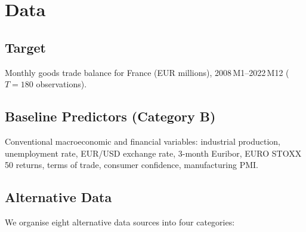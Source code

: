 \section{Data}
\label{sec:ch2_data}

\subsection{Target}

Monthly goods trade balance for France (EUR millions), 2008\,M1--2022\,M12 ($T = 180$ observations).

\subsection{Baseline Predictors (Category B)}

Conventional macroeconomic and financial variables: industrial production, unemployment rate, EUR/USD exchange rate, 3-month Euribor, EURO STOXX 50 returns, terms of trade, consumer confidence, manufacturing PMI.

\subsection{Alternative Data}

We organise eight alternative data sources into four categories:

